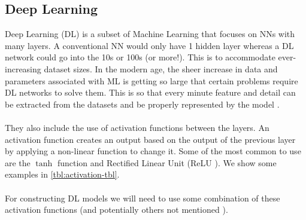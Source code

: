 \subsection{Deep Learning}
Deep Learning (DL) is a subset of Machine Learning that focuses on NNs with many layers. A conventional NN would only have 1 hidden layer whereas a DL network could go into the 10s or 100s (or more!). This is to accommodate ever-increasing dataset sizes. In the modern age, the sheer increase in data and parameters associated with ML is getting so large that certain problems require DL networks to solve them. This is so that every minute feature and detail can be extracted from the datasets and be properly represented by the model \cite{deeplearningbook}.\\ \\
They also include the use of activation functions between the layers. An activation function creates an output based on the output of the previous layer by applying a non-linear function to change it. Some of the most common to use are the $\tanh$ function and Rectified Linear Unit (ReLU \cite{relu}). We show some examples in \ref{tbl:activation-tbl}. \\ \\
For constructing DL models we will need to use some combination of these activation functions (and potentially others not mentioned \cite{wiki:activation}).

\newcommand{\tanhFunc}{
    $\tanh(x) = \dfrac{e^x - e^{-x}}{e^x + e^{-x}}$
}
\newcommand{\ReluFunc}{
    $ReLU(x) =
    \begin{cases}
      0 \hspace{0.5cm} $if $ x \leq 0\\    
      x \hspace{0.5cm} $if $ x > 0
    \end{cases}
    $
}
\newcommand{\SigmoidFunc}{
    $\sigma(x) = \dfrac{1}{1 + e^{-x}}$
}

\newcommand{\tanhDerivative}{
    $1 - \tanh(x)^2$
}
\newcommand{\ReluDerivative}{
    $
    \begin{cases}
      0 \hspace{0.5cm} $if $ x < 0\\
      1 \hspace{0.5cm} $if $ x > 0\\
      undefined \hspace{0.5cm} $if $ x == 0
    \end{cases}
    $
}
\newcommand{\SigmoidDerivative}{
    $\sigma(x)(1 - \sigma(x))$
}

